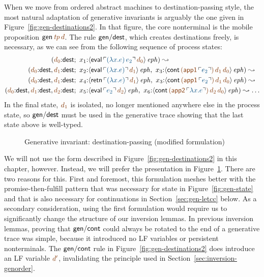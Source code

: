 When we move from ordered abstract machines to destination-passing
style, the most natural adaptation of generative invariants is
arguably the one given in Figure~\ref{fig:gen-destinations2}. In that
figure, the core nonterminal is the mobile proposition ${\sf
  gen}\,\lf{{\it tp}}\,\lf{d}$. The rule ${\sf gen/dest}$, which 
creates destinations freely, is
necessary, as we can see from the following sequence of 
process states:
\begin{align*}
( \lf{d_0}{:}{\sf dest}&; ~
       x_1{:}\iseph{\susp{{\sf eval}
          \,\lf{\interp{(\lambda x.e)\,e_2}}\,\lf{d_0}}}
) 
\leadsto
\\
( \lf{d_0}{:}{\sf dest}, \lf{d_1}{:}{\sf dest}&; ~ 
       x_2{:}\iseph{\susp{{\sf eval}\,\lf{\interp{(\lambda x.e)}}\,\lf{d_1}}}, ~
       x_3{:}\iseph{\susp{{\sf cont}
          \,\lf{({\sf app1}\,\interp{e_2})}\,\lf{d_1}\,\lf{d_0}}}
)
\leadsto
\\
( \lf{d_0}{:}{\sf dest}, \lf{d_1}{:}{\sf dest}&; ~ 
       x_4{:}\iseph{\susp{{\sf retn}\,\lf{\interp{(\lambda x.e)}}\,\lf{d_1}}}, ~
       x_3{:}\iseph{\susp{{\sf cont}
          \,\lf{({\sf app1}\,\interp{e_2})}\,\lf{d_1}\,\lf{d_0}}}
)
\leadsto
\\
( \lf{d_0}{:}{\sf dest}, \lf{d_1}{:}{\sf dest}, \lf{d_2}{:}{\sf dest}&; ~ 
       x_5{:}\iseph{\susp{{\sf eval}\,\lf{\interp{e_2}}\,\lf{d_2}}}, ~
       x_6{:}\iseph{\susp{{\sf cont}
          \,\lf{({\sf app2}\,\interp{\lambda x.e})}\,\lf{d_2}\,\lf{d_0}}}
)
\leadsto \ldots
\end{align*}
In the final state, $\lf{d_1}$ is isolated, no longer mentioned
anywhere else in the process state, so ${\sf gen/dest}$ must be used
in the generative trace showing that the last state above is well-typed.

\begin{figure}[tp]
\caption{Generative invariant: destination-passing (modified formulation)}
\label{fig:gen-destinations} 
\end{figure}

We will not use the form described in
Figure~\ref{fig:gen-destinations2} in this chapter, however. Instead,
we will prefer the presentation in Figure~\ref{fig:gen-destinations}.
There are two reasons for this. First and foremost, this formulation
meshes better with the promise-then-fulfill pattern that was necessary
for state in Figure~\ref{fig:gen-state} and that is also necessary for
continuations in Section~\ref{sec:gen-letcc} below. As a secondary
consideration, using the first formulation would require us to 
significantly change the structure of our inversion lemmas.
In previous inversion lemmas, proving
that ${\sf gen/cont}$ could always be rotated to the end of a
generative trace was simple, because it introduced no LF variables or
persistent nonterminals. The ${\sf gen/cont}$ rule in
Figure~\ref{fig:gen-destinations2} does introduce an LF variable
$\lf{d'}$, invalidating the principle used in
Section~\ref{sec:inversion-genorder}.

